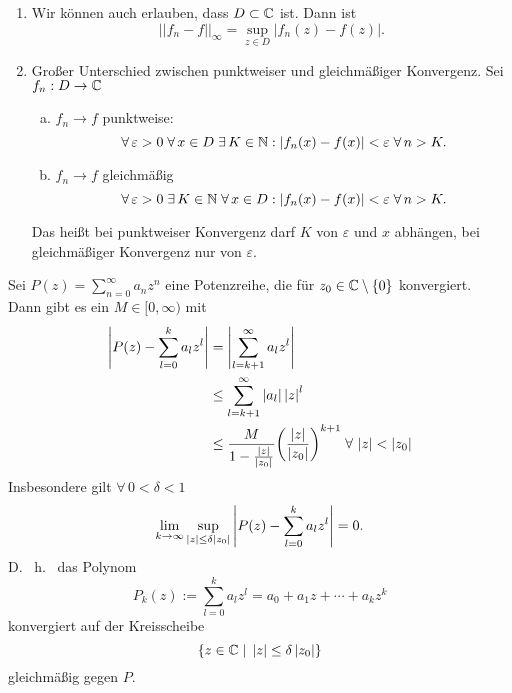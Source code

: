 \documentclass[../ana1.tex]{subfiles}
\begin{document}
\begin{bem} \leavevmode
    \begin{enumerate}
        \item Wir können auch erlauben, dass \(D \subset \mathbb{C} \) 
        ist. Dann ist 
        \[ ||f_n-f||_\infty = \underset{z \in D}{\sup}|f_n(z) 
        - f(z)|. \]
        \item Großer Unterschied zwischen punktweiser und 
        gleichmäßiger Konvergenz. Sei \( f_n : D \rightarrow \mathbb{C} \) 
        \begin{enumerate}[(a)]
            \item \( f_n \rightarrow f \) punktweise: 
            \[ \forall \, \varepsilon > 0 \; \forall \, x \in 
            D \; \exists \, K \in \mathbb{N}: \left| f_n(x) - f(x) \right| 
            < \varepsilon \; \forall \, n > K. \]
            \item \( f_n \rightarrow f \) gleichmäßig
            \[ \forall \, \varepsilon > 0 \; \exists \, K \in \mathbb{N} 
            \;\forall \, x \in D: \left| f_n(x) - f(x) \right| < \varepsilon 
            \;\forall \, n > K. \]
        \end{enumerate}
        Das heißt bei punktweiser Konvergenz darf \( K \) von 
        \( \varepsilon \) und \( x \) abhängen, bei gleichmäßiger 
        Konvergenz nur von \( \varepsilon \).
    \end{enumerate}
\end{bem}
\begin{lem}\label{satz:glmKonvPotenz}
    Sei \( P(z) = \sum_{n=0}^\infty a_n z^n \) eine Potenzreihe, 
    die für \( z_0 \in \mathbb{C} \setminus \{0\} \) konvergiert. \\
    Dann gibt es ein \( M \in [0,\infty) \) mit 
    \begin{align*}
        \left| P(z) - \sum_{l=0}^k a_l z^l \right| 
        &= \left| \sum_{l=k+1}^\infty a_l z^l \right|\\
        &\leq \sum_{l=k+1}^\infty \left| a_l \right| \left| z \right|^l \\
        &\leq \frac{ M }{ 1 - \frac{\left|z\right|}{\left|z_0\right|} } 
        {\left( \frac{\left|z\right|}{\left|z_0\right|} \right)}^{k+1} 
        \; \forall \, \left|z\right| < \left|z_0\right|
    \end{align*}
    Insbesondere gilt \( \forall \, 0 < \delta < 1 \)
    \[ \lim\limits_{k\rightarrow\infty} \underset{\left|z\right| \leq \delta \left|z_0\right|}{\sup} 
    \left| P(z) - \sum_{l=0}^k a_l z^l \right| = 0. \]
    D. \ h. \ das Polynom 
    \[ P_k(z) := \sum_{l=0}^k a_l z^l 
    = a_0 + a_1 z + \cdots + a_k z^k \]
    konvergiert auf der Kreisscheibe 
    \[ \{ z \in \mathbb{C} \;\vert \; \left|z\right| \leq 
    \delta \left|z_0\right| \} \]
    gleichmäßig gegen \( P \).
\end{lem}
\end{document}
